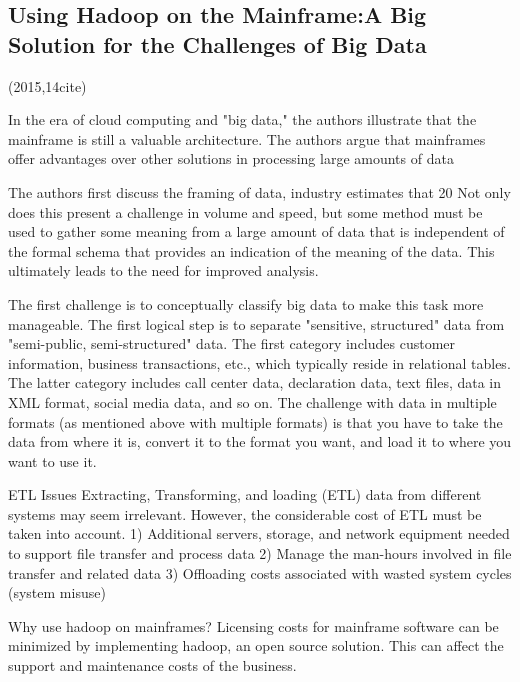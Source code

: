 \documentclass[a4paper,twoside]{scrbook}
\begin{document}
\subsection{Using Hadoop on the Mainframe:A Big Solution for the Challenges of Big Data \cite{seay2015using}}
(2015,14cite)\par
In the era of cloud computing and "big data," the authors illustrate that the mainframe is still a valuable architecture. The authors argue that mainframes offer advantages over other solutions in processing large amounts of data
\par
The authors first discuss the framing of data, industry estimates that 20%
Not only does this present a challenge in volume and speed, but some method must be used to gather some meaning from a large amount of data that is independent of the formal schema that provides an indication of the meaning of the data. This ultimately leads to the need for improved analysis.
\par
The first challenge is to conceptually classify big data to make this task more manageable. The first logical step is to separate "sensitive, structured" data from "semi-public, semi-structured" data.
The first category includes customer information, business transactions, etc., which typically reside in relational tables.
The latter category includes call center data, declaration data, text files, data in XML format, social media data, and so on.
The challenge with data in multiple formats (as mentioned above with multiple formats) is that you have to take the data from where it is, convert it to the format you want, and load it to where you want to use it.
\par
ETL Issues
Extracting, Transforming, and loading (ETL) data from different systems may seem irrelevant. However, the considerable cost of ETL must be taken into account.
1) Additional servers, storage, and network equipment needed to support file transfer and process data
2) Manage the man-hours involved in file transfer and related data
3) Offloading costs associated with wasted system cycles (system misuse)
\par\par
Why use hadoop on mainframes?
Licensing costs for mainframe software can be minimized by implementing hadoop, an open source solution. This can affect the support and maintenance costs of the business.
\end{document}
